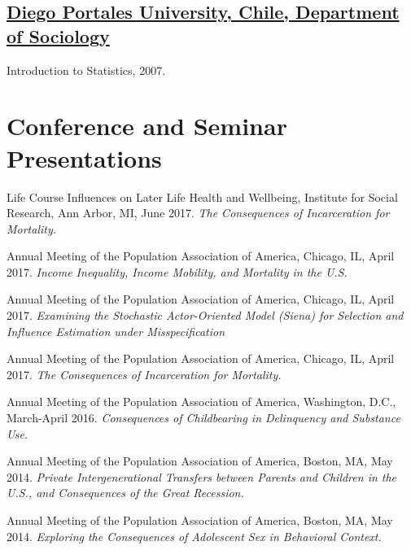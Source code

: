\documentclass[10pt,letterpaper]{article}
\renewenvironment{itemize}{
  \begin{list}{}{
    \setlength{\leftmargin}{1.5em}
    \setlength{\itemsep}{0.25em}
    \setlength{\parskip}{0pt}
    \setlength{\parsep}{0.25em}
  }
}{
  \end{list}
}
\begin{document}
\subsection*{\href{http://www.udp.cl/facultades_carreras/ciencias_sociales-historia/}{Diego Portales University, Chile, Department of Sociology}}

\begin{itemize}
\item Introduction to Statistics, 2007.
\end{itemize}


\section*{Conference and Seminar Presentations}

\begin{itemize}

\item Life Course Influences on Later Life Health and Wellbeing, Institute for Social Research, Ann Arbor, MI, June 2017. {\textit{The Consequences of Incarceration for Mortality.}}


\item  Annual Meeting of the Population Association of America, Chicago, IL, April 2017. {\textit{Income Inequality, Income Mobility, and Mortality in the U.S.}}

\item  Annual Meeting of the Population Association of America, Chicago, IL, April 2017. {\textit{Examining the Stochastic Actor-Oriented Model (Siena) for Selection and Influence Estimation under Misspecification}}

\item  Annual Meeting of the Population Association of America, Chicago, IL, April 2017. {\textit{The Consequences of Incarceration for Mortality.}}

\item  Annual Meeting of the Population Association of America, Washington, D.C., March-April 2016. {\textit{Consequences of Childbearing in Delinquency and Substance Use.}}

\item  Annual Meeting of the Population Association of America, Boston, MA, May 2014. {\textit{Private Intergenerational Transfers between Parents and Children in the U.S., and Consequences of the Great Recession.}}

\item  Annual Meeting of the Population Association of America, Boston, MA, May 2014. {\textit{Exploring the Consequences of Adolescent Sex in Behavioral Context.}}


\end{itemize}
\end{document}
